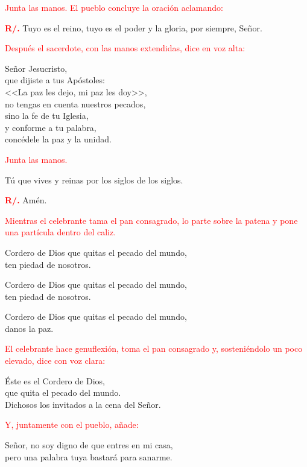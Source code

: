 \documentclass[12pt, letterpaper]{report}
\begin{document}
\large{\textcolor{red}{Junta las manos. El pueblo concluye la oraci\'on aclamando:}}

\noindent
\Large {\bfseries \textcolor{red}{R/.}} \hspace{0.5cm} Tuyo es el reino, tuyo es el poder y la gloria, por siempre, Se\~nor.

\large{\textcolor{red}{Despu\'es el sacerdote, con las manos extendidas, dice en voz alta:}}

\noindent
\Large Se\~nor Jesucristo,\\ 
que dijiste a tus Ap\'ostoles:\\ 
<<La paz les dejo, mi paz les doy>>,\\ 
no tengas en cuenta nuestros pecados,\\ 
sino la fe de tu Iglesia,\\ 
y conforme a tu palabra,\\ 
conc\'edele la paz y la unidad.

\large{\textcolor{red}{Junta las manos.}}

\Large T\'u que vives y reinas por los siglos de los siglos.

\noindent
\Large {\bfseries \textcolor{red}{R/.}} \hspace{0.5cm} Am\'en.

\large{\textcolor{red}{Mientras el celebrante tama el pan consagrado, lo parte sobre la patena y pone una part\'icula dentro del caliz.}}

\noindent
\Large Cordero de Dios que quitas el pecado del mundo,\\
ten piedad de nosotros.

\noindent
\Large Cordero de Dios que quitas el pecado del mundo,\\ 
ten piedad de nosotros.

\noindent
\Large Cordero de Dios que quitas el pecado del mundo,\\ 
danos la paz.

\large{\textcolor{red}{El celebrante hace genuflexi\'on, toma el pan consagrado y, sosteni\'endolo un poco elevado, dice con voz clara:}}

\noindent
\Large \'Este es el Cordero de Dios,\\ 
que quita el pecado del mundo.\\ 
Dichosos los invitados a la cena del Se\~nor.

\large{\textcolor{red}{Y, juntamente con el pueblo, a\~nade:}}

\noindent
\Large Se\~nor, no soy digno de que entres en mi casa,\\ 
pero una palabra tuya bastar\'a para sanarme.
\end{document}
